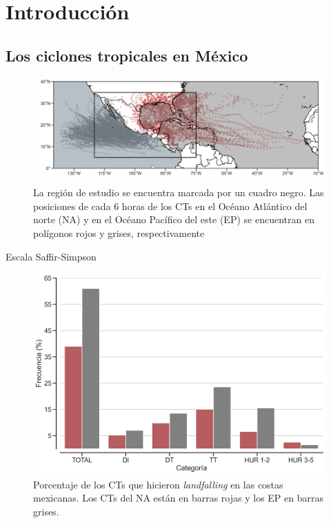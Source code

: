 \section{Introducción}
\subsection{Los ciclones tropicales en México}
\begin{frame}
    \begin{figure}[H]
        \centering
        \includegraphics[scale = 0.275]{Images/Figures/Fig_2_1.jpeg}
        \caption{La región de estudio se encuentra marcada por un cuadro negro. Las posiciones de cada 6 horas de los CTs en el Océano Atlántico del norte (NA) y en el Océano Pacífico del este (EP) se encuentran en polígonos rojos y grises, respectivamente}
        \label{fig:fig_1}
    \end{figure}
\end{frame}

\begin{frame}{Escala Saffir-Simpson}
    
\end{frame}

\begin{frame}
    \begin{figure}
        \centering
        \includegraphics[scale=0.35]{Images/Figures/Fig_1_1.jpeg}
        \caption{Porcentaje de los CTs que hicieron \textit{landfalling} en las costas mexicanas. Los CTs del {\red NA} están en barras rojas  y los {\gray EP} en barras grises.}
        \label{fig:fig_2}
    \end{figure}
\end{frame}

